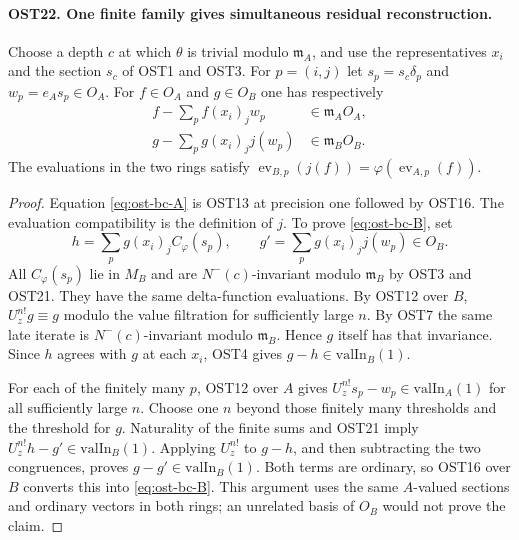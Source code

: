 \documentclass[11pt,a4paper]{article}
\numberwithin{equation}{section}
\theoremstyle{remark}\newtheorem{remark}[theorem]{Remark}
\begin{document}
\paragraph{OST22. One finite family gives simultaneous residual reconstruction.}
\label{claim:OST22}
Choose a depth $c$ at which $\theta$ is trivial modulo
$\mathfrak m_A$, and use the representatives $x_i$ and
the section $s_c$ of OST1 and OST3.  For
$p=(i,\allowbreak{} j)$ let $s_p=s_c\delta_p$ and $w_p=e_A s_p\in O_A$.
For $f\in O_A$ and $g\in O_B$ one has respectively
\begin{align}
 f-\sum_p f(x_i)_j w_p&\in\mathfrak m_AO_A,\label{eq:ost-bc-A}\\
 g-\sum_p g(x_i)_j j(w_p)&\in\mathfrak m_BO_B.
 \label{eq:ost-bc-B}
\end{align}
The evaluations in the two rings satisfy
$\operatorname{ev}_{B,\allowbreak{} p}(j(f))=\varphi(\operatorname{ev}_{A,\allowbreak{} p}(f))$.
\begin{proof}
Equation \eqref{eq:ost-bc-A} is OST13 at precision one
followed by OST16.  The evaluation compatibility is the
definition of $j$.  To prove \eqref{eq:ost-bc-B}, set
\[
 h=\sum_p g(x_i)_j C_\varphi(s_p),\qquad
 g'=\sum_p g(x_i)_j j(w_p)\in O_B.
\]
All $C_\varphi(s_p)$ lie in $M_B$ and are
$N^-(c)$-invariant modulo $\mathfrak m_B$ by OST3 and
OST21.  They have the same delta-function evaluations.
By OST12 over $B$, $U_z^{n!}g\equiv g$ modulo the
value filtration for sufficiently large $n$.  By OST7
the same late iterate is $N^-(c)$-invariant modulo
$\mathfrak m_B$.  Hence $g$ itself has that invariance.
Since $h$ agrees with $g$ at each $x_i$, OST4 gives
$g-h\in\mathrm{valIn}_B(1)$.

For each of the finitely many $p$, OST12 over $A$ gives
$U_z^{n!}s_p-w_p\in\mathrm{valIn}_A(1)$ for all
sufficiently large $n$.  Choose one $n$ beyond those
finitely many thresholds and the threshold for $g$.
Naturality of the finite sums and OST21 imply
$U_z^{n!}h-g'\in\mathrm{valIn}_B(1)$.
Applying $U_z^{n!}$ to $g-h$, and then subtracting the
two congruences, proves $g-g'\in\mathrm{valIn}_B(1)$.
Both terms are ordinary, so OST16 over $B$ converts this
into \eqref{eq:ost-bc-B}.  This argument uses the same
$A$-valued sections and ordinary vectors in both rings;
an unrelated basis of $O_B$ would not prove the claim.
\end{proof}

\end{document}
